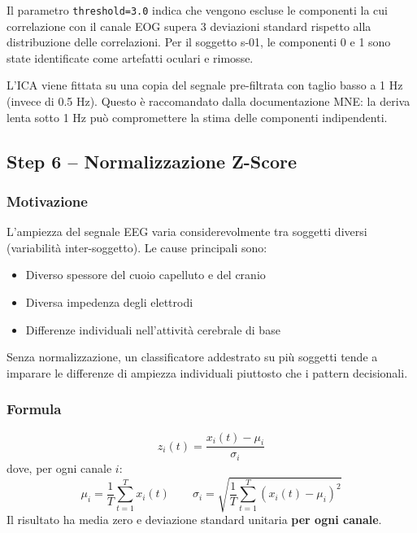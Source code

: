 \documentclass[12pt, a4paper]{article}
\begin{document}
Il parametro \texttt{threshold=3.0} indica che vengono escluse le componenti la cui correlazione con il canale EOG supera 3 deviazioni standard rispetto alla distribuzione delle correlazioni. Per il soggetto s-01, le componenti 0 e 1 sono state identificate come artefatti oculari e rimosse.

\begin{notabox}
L'ICA viene fittata su una copia del segnale pre-filtrata con taglio basso a 1 Hz (invece di 0.5 Hz). Questo è raccomandato dalla documentazione MNE: la deriva lenta sotto 1 Hz può compromettere la stima delle componenti indipendenti.
\end{notabox}

\subsection{Step 6 -- Normalizzazione Z-Score}

\subsubsection{Motivazione}
L'ampiezza del segnale EEG varia considerevolmente tra soggetti diversi (variabilità inter-soggetto). Le cause principali sono:
\begin{itemize}
    \item Diverso spessore del cuoio capelluto e del cranio
    \item Diversa impedenza degli elettrodi
    \item Differenze individuali nell'attività cerebrale di base
\end{itemize}

Senza normalizzazione, un classificatore addestrato su più soggetti tende a imparare le differenze di ampiezza individuali piuttosto che i pattern decisionali.

\subsubsection{Formula}

\begin{formulabox}
\[
z_i(t) = \frac{x_i(t) - \mu_i}{\sigma_i}
\]
dove, per ogni canale $i$:
\[
\mu_i = \frac{1}{T}\sum_{t=1}^{T} x_i(t) \qquad
\sigma_i = \sqrt{\frac{1}{T}\sum_{t=1}^{T}(x_i(t) - \mu_i)^2}
\]
Il risultato ha media zero e deviazione standard unitaria \textbf{per ogni canale}.
\end{formulabox}
\end{document}
